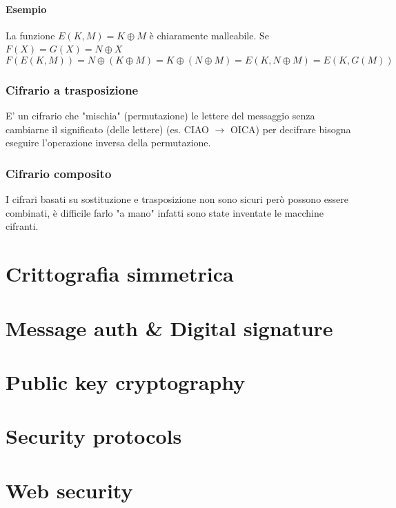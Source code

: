 \documentclass[12pt, a4paper]{report}
\begin{document}
\subsubsection{Esempio}
La funzione $E(K,M)=K\oplus M$ è chiaramente malleabile. Se $F(X)=G(X)=N\oplus X$
\begin{equation*}
    F(E(K,M)) = N\oplus (K\oplus M) = K \oplus (N\oplus M) = E(K,N\oplus M) = E(K,G(M))
\end{equation*}
\subsection{Cifrario a trasposizione}
E' un cifrario che "mischia" (permutazione) le lettere del messaggio senza cambiarne il significato (delle lettere) (es. CIAO $\rightarrow$ OICA) per decifrare bisogna eseguire l'operazione inversa della permutazione.
\subsection{Cifrario composito}
I cifrari basati su sostituzione e trasposizione non sono sicuri però possono essere combinati, è difficile farlo "a mano" infatti sono state inventate le macchine cifranti.
\chapter{Crittografia simmetrica}
\chapter{Message auth \& Digital signature}
\chapter{Public key cryptography}
\chapter{Security protocols}
\chapter{Web security}
\end{document}
